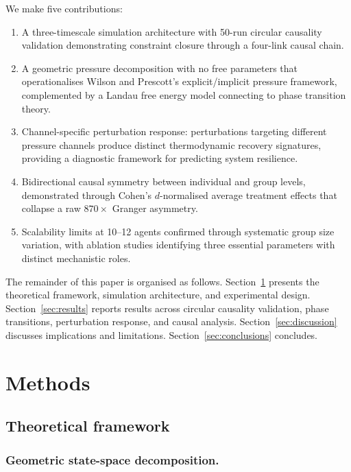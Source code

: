 \documentclass[12pt]{article}
\begin{document}
We make five contributions:
\begin{enumerate}
\item A three-timescale simulation architecture with 50-run circular causality validation demonstrating constraint closure through a four-link causal chain.
\item A geometric pressure decomposition with no free parameters that operationalises Wilson and Prescott's explicit/implicit pressure framework, complemented by a Landau free energy model connecting to phase transition theory.
\item Channel-specific perturbation response: perturbations targeting different pressure channels produce distinct thermodynamic recovery signatures, providing a diagnostic framework for predicting system resilience.
\item Bidirectional causal symmetry between individual and group levels, demonstrated through Cohen's $d$-normalised average treatment effects that collapse a raw $870\times$ Granger asymmetry.
\item Scalability limits at 10--12 agents confirmed through systematic group size variation, with ablation studies identifying three essential parameters with distinct mechanistic roles.
\end{enumerate}

The remainder of this paper is organised as follows. Section~\ref{sec:methods} presents the theoretical framework, simulation architecture, and experimental design. Section~\ref{sec:results} reports results across circular causality validation, phase transitions, perturbation response, and causal analysis. Section~\ref{sec:discussion} discusses implications and limitations. Section~\ref{sec:conclusions} concludes.


\section{Methods}
\label{sec:methods}

\subsection{Theoretical framework}
\label{sec:theory}

\subsubsection{Geometric state-space decomposition.}
\end{document}
